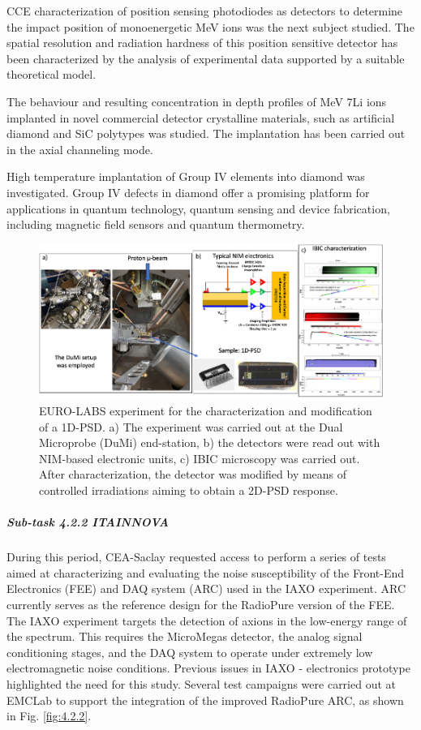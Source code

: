 CCE characterization of position sensing photodiodes as detectors to determine the impact position of monoenergetic MeV ions was the next subject studied. The spatial resolution and radiation hardness of this position sensitive detector has been characterized by the analysis of experimental data supported by a suitable theoretical model. 

The behaviour and resulting concentration in depth profiles of MeV 7Li ions implanted in novel commercial detector crystalline materials, such as artificial diamond and SiC polytypes was studied. The implantation has been carried out in the axial channeling mode. 

High temperature implantation of Group IV elements into diamond was investigated. Group IV defects in diamond offer a promising platform for applications in quantum technology, quantum sensing and device fabrication, including magnetic field sensors and quantum thermometry. 

\begin{figure} [!h]
    \centering
    \includegraphics[width=0.75\linewidth]{image4.png}
    \caption{EURO-LABS experiment for the characterization and modification of a 1D-PSD. a) The experiment was carried out at the Dual Microprobe (DuMi) end-station, b) the detectors were read out with NIM-based electronic units, c) IBIC microscopy was carried out. After characterization, the detector was modified by means of controlled irradiations aiming to obtain a 2D-PSD response.}
    \label{fig:4.2.1}
\end{figure}

\subparagraph{Sub-task 4.2.2 ITAINNOVA} \mbox{}

During this period, CEA-Saclay requested access to perform a series of tests aimed at characterizing and evaluating the noise susceptibility of the Front-End Electronics (FEE) and DAQ system (ARC) used in the IAXO experiment. ARC currently serves as the reference design for the RadioPure version of the FEE. The IAXO experiment targets the detection of axions in the low-energy range of the spectrum. This requires the MicroMegas detector, the analog signal conditioning stages, and the DAQ system to operate under extremely low electromagnetic noise conditions. Previous issues in IAXO - electronics prototype highlighted the need for this study. Several test campaigns were carried out at EMCLab to support the integration of the improved RadioPure ARC, as shown in Fig. \ref{fig:4.2.2}.

